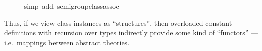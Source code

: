 \begin{isabellebody}
\ \ \ \ \isamarkupfalse%
\ {\isacharparenleft}simp\ add{\isacharcolon}\ semigroup{\isacharunderscore}class{\isachardot}assoc{\isacharparenright}\isanewline
{}\isamarkupfalse%
%
\endisatagproof
{\isafoldproof}%
%
\isadelimproof
%
\endisadelimproof
%
\begin{isamarkuptext}%
Thus, if we view class instances as ``structures'', then overloaded
  constant definitions with recursion over types indirectly provide
  some kind of ``functors'' --- i.e.\ mappings between abstract
  theories.%
\end{isamarkuptext}%
\isamarkuptrue%
%
\isadelimtheory
%
\endisadelimtheory
%
\isatagtheory
{}\isamarkupfalse%
%
\endisatagtheory
{\isafoldtheory}%
%
\isadelimtheory
%
\endisadelimtheory
\isanewline
\end{isabellebody}%
